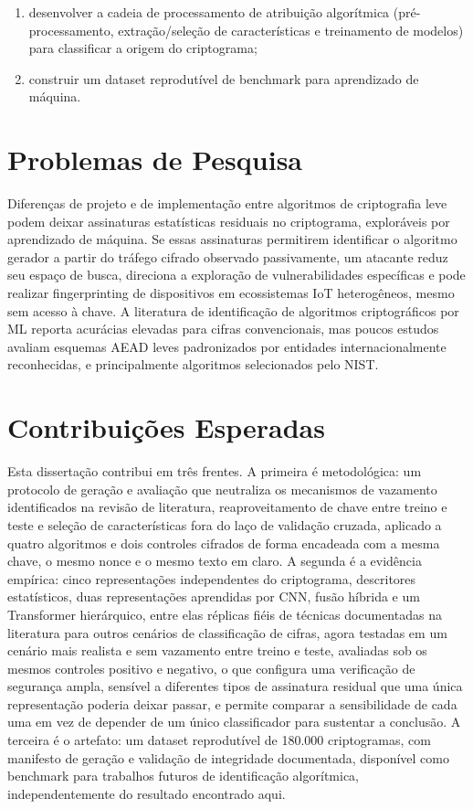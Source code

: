 \begin{enumerate}
\item  desenvolver a cadeia de processamento de atribuição algorítmica (pré-processamento,
extração/seleção de características e treinamento de modelos) para classificar a
origem do criptograma;
\item construir um dataset reprodutível de benchmark para aprendizado de máquina.

\end{enumerate}

\section{Problemas de Pesquisa}
Diferenças de projeto e de implementação entre algoritmos de criptografia leve podem deixar assinaturas estatísticas residuais no criptograma, exploráveis por aprendizado de máquina. Se essas assinaturas permitirem identificar o algoritmo gerador a partir do tráfego cifrado observado passivamente, um atacante reduz seu espaço de busca, direciona a exploração de vulnerabilidades específicas e pode realizar fingerprinting de dispositivos em ecossistemas IoT heterogêneos, mesmo sem acesso à chave. A literatura de identificação de algoritmos criptográficos por ML reporta acurácias elevadas para cifras convencionais, mas poucos estudos avaliam esquemas AEAD leves padronizados por entidades internacionalmente reconhecidas, e principalmente algoritmos selecionados pelo NIST.

\section{Contribuições Esperadas}
Esta dissertação contribui em três frentes. A primeira é metodológica: um protocolo de geração e avaliação que neutraliza os mecanismos de vazamento identificados na revisão de literatura, reaproveitamento de chave entre treino e teste e seleção de características fora do laço de validação cruzada, aplicado a quatro algoritmos e dois controles cifrados de forma encadeada com a mesma chave, o mesmo nonce e o mesmo texto em claro. A segunda é a evidência empírica: cinco representações independentes do criptograma, descritores estatísticos, duas representações aprendidas por CNN, fusão híbrida e um Transformer hierárquico, entre elas réplicas fiéis de técnicas documentadas na literatura para outros cenários de classificação de cifras, agora testadas em um cenário mais realista e sem vazamento entre treino e teste, avaliadas sob os mesmos controles positivo e negativo, o que configura uma verificação de segurança ampla, sensível a diferentes tipos de assinatura residual que uma única representação poderia deixar passar, e permite comparar a sensibilidade de cada uma em vez de depender de um único classificador para sustentar a conclusão. A terceira é o artefato: um dataset reprodutível de 180.000 criptogramas, com manifesto de geração e validação de integridade documentada, disponível como benchmark para trabalhos futuros de identificação algorítmica, independentemente do resultado encontrado aqui.